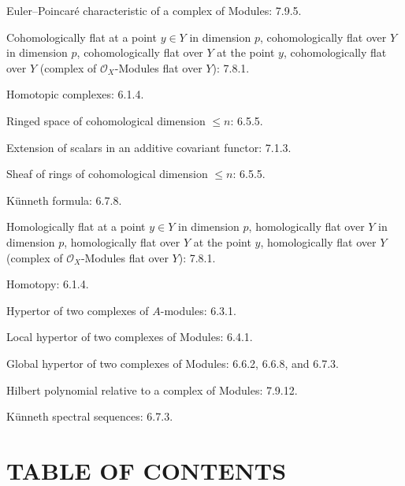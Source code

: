 \documentclass[10pt,oneside]{book}
\newcommand{\sh}[1]{\mathscr{#1}}
\newcommand{\oldpage}[2][]{\setcounter{footnote}{0}\marginpar{\scriptsize\textbf{#1}~|~#2}\ignorespaces}
\begin{document}
\begin{flushleft}
Euler--Poincaré characteristic of a complex of Modules: 7.9.5.

\medskip
Cohomologically flat at a point $y\in Y$ in dimension $p$,
cohomologically flat over $Y$ in dimension $p$, cohomologically flat over
$Y$ at the point $y$, cohomologically flat over $Y$ (complex of
$\sh{O}_X$-Modules flat over $Y$): 7.8.1.

\medskip
Homotopic complexes: 6.1.4.

\medskip
Ringed space of cohomological dimension $\leq n$: 6.5.5.

\medskip
Extension of scalars in an additive covariant functor: 7.1.3.

\medskip
Sheaf of rings of cohomological dimension $\leq n$: 6.5.5.

\medskip
Künneth formula: 6.7.8.

\medskip
Homologically flat at a point $y\in Y$ in dimension $p$, homologically flat
over $Y$ in dimension $p$, homologically flat over $Y$ at the point $y$,
homologically flat over $Y$ (complex of $\sh{O}_X$-Modules flat over $Y$):
7.8.1.

\medskip
Homotopy: 6.1.4.

\medskip
Hypertor of two complexes of $A$-modules: 6.3.1.

\medskip
Local hypertor of two complexes of Modules: 6.4.1.

\medskip
Global hypertor of two complexes of Modules: 6.6.2, 6.6.8, and 6.7.3.

\medskip
Hilbert polynomial relative to a complex of Modules: 7.9.12.

\medskip
Künneth spectral sequences: 6.7.3.
\end{flushleft}

\clearpage
\oldpage[III]{215}
\section*{TABLE OF CONTENTS}
\end{document}
